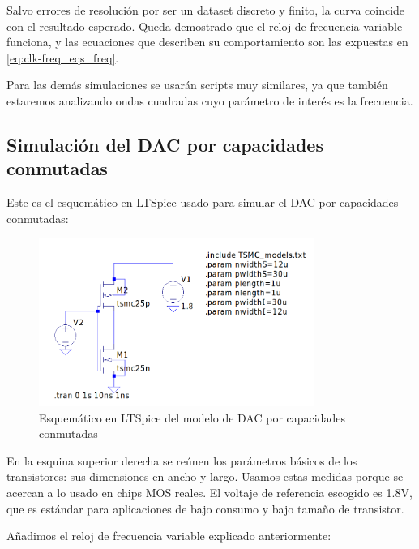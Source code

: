\documentclass[12pt]{report} %
\begin{document}
	Salvo errores de resolución por ser un dataset discreto y finito, la curva coincide con el resultado esperado. Queda demostrado que el reloj de frecuencia variable funciona, y las ecuaciones que describen su comportamiento son las expuestas en \ref{eq:clk-freq_eqs_freq}.
	
	Para las demás simulaciones se usarán scripts muy similares, ya que también estaremos analizando ondas cuadradas cuyo parámetro de interés es la frecuencia.	


	\subsection{Simulación del DAC por capacidades conmutadas}
	
	Este es el esquemático en LTSpice usado para simular el DAC por capacidades conmutadas:
	
	\begin{figure}[H]
		\includegraphics[width=0.8\textwidth]{ltspice-sw-cap-empty.png}
		\caption[Esquemático en LTSpice del modelo de DAC por capacidades conmutadas]{Esquemático en LTSpice del modelo de DAC por capacidades conmutadas}
		\label{fig:ltspice-sw-cap-empty.png}
	\end{figure}
	
	En la esquina superior derecha se reúnen los parámetros básicos de los transistores: sus dimensiones en ancho y largo. Usamos estas medidas porque se acercan a lo usado en chips MOS reales. 
	El voltaje de referencia escogido es 1.8V, que es estándar para aplicaciones de bajo consumo y bajo tamaño de transistor.
	
	Añadimos el reloj de frecuencia variable explicado anteriormente:
\end{document}
